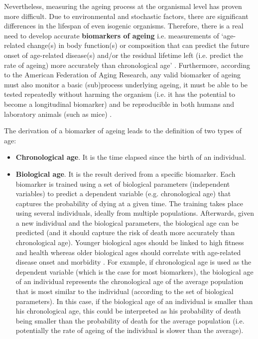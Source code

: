 \bigskip

Nevertheless, measuring the ageing process at the organismal level has proven more difficult. Due to environmental and stochastic factors, there are significant differences in the lifespan of even isogenic organisms. Therefore, there is a real need to develop accurate \textbf{biomarkers of ageing} i.e. measurements of `age-related change(s) in body function(s) or composition that can predict the future onset of age-related disease(s) and/or the residual lifetime left (i.e. predict the rate of ageing) more accurately than chronological age' \citep{Burkle2015a}. Furthermore, according to the American Federation of Aging Research, any valid biomarker of ageing must also monitor a basic (sub)process underlying ageing, it must be able to be tested repeatedly without harming the organism (i.e. it has the potential to become a longitudinal biomarker) and be reproducible in both humans and laboratory animals (such as mice) \citep{Burkle2015a}.

\bigskip

The derivation of a biomarker of ageing leads to the definition of two types of age:

\begin{itemize}
	
	\item \textbf{Chronological age}. It is the time elapsed since the birth of an individual.
	
	\item \textbf{Biological age}. It is the result derived from a specific biomarker. Each biomarker is trained using a set of biological parameters (independent variables) to predict a dependent variable (e.g. chronological age) that captures the probability of dying at a given time. The training takes place using several individuals, ideally from multiple populations. Afterwards, given a new individual and the biological parameters, the biological age can be predicted (and it should capture the risk of death more accurately than chronological age). Younger biological ages should be linked to high fitness and health whereas older biological ages should correlate with age-related disease onset and morbidity \citep{Benayoun2015a}. For example, if chronological age is used as the dependent variable (which is the case for most biomarkers), the biological age of an individual represents the chronological age of the average population that is most similar to the individual (according to the set of biological parameters). In this case, if the biological age of an individual is smaller than his chronological age, this could be interpreted as his probability of death being smaller than the probability of death for the average population (i.e. potentially the rate of ageing of the individual is slower than the average). 
	
\end{itemize}

